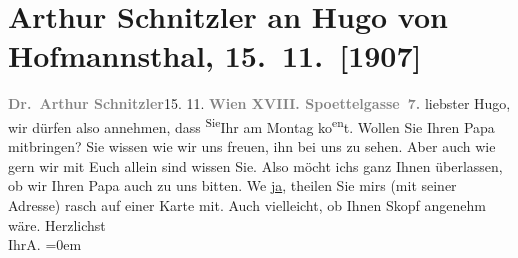 

         
         \renewcommand{\erwaehntePersonen}{Personen: Hugo von Hofmannsthal, Hugo August von Hofmannsthal, Gustav Schwarzkopf}
         \renewcommand{\erwaehnteOrte}{Orte: Edmund-Weiß-Gasse, Wien}
         \renewcommand{\erwaehnteWerke}{}
               \section[Arthur Schnitzler an Hugo von Hofmannsthal, 15. 11. {[}1907{]}]{ Arthur Schnitzler an Hugo von Hofmannsthal, 15. 11. {[}1907{]}}\nopagebreak{}\rehead{ }\begin{ledgroupsized}[t]{13cm}\normalsize\beginnumbering \toendnotes[C]{\smallbreak\pagebreak[2]} 
\toendnotes[C]{\smallbreak}\pstart
           {\pb}\textcolor{gray}{\textbf{Dr. Arthur Schnitzler}}\hfill 15.
                     11.\pend
           \pstart
           \textcolor{gray}{\textbf{Wien XVIII.
                        Spoettelgasse 7.}}\pend
           \pstart
           liebster Hugo, wir dürfen also annehmen, dass \substVorne{}\textsuperscript{Sie}\substDazwischen{}Ihr\substHinten{} am
                  Montag ko{\geminationm}\substVorne{}\textsuperscript{en}\substDazwischen{}t\substHinten{}. Wollen Sie Ihren Papa mitbringen? Sie wissen wie
               wir uns freuen, ihn bei uns zu sehen. Aber auch wie gern wir mit Euch allein sind
               wissen Sie. Also möcht ichs ganz Ihnen überlassen, ob wir {\pb}Ihren Papa auch zu uns
               bitten. We{\geminationn}{ }\uline{ja}, theilen Sie mirs (mit seiner Adresse) rasch auf einer
               Karte mit. Auch vielleicht, ob Ihnen Skopf
               angenehm wäre.\pend
           \pstart
           Herzlichst{\\[\baselineskip]}Ihr\spacefill\mbox{A.}\pend
           \leftskip=0em{}
         
         \endnumbering{}\end{ledgroupsized}  \newcommand{\dateiname}{L01731}\newcommand{\titel}{Arthur Schnitzler an Hugo von Hofmannsthal, 15. 11. [1907]}\newcommand{\editorInnen}{Martin Anton Müller und Gerd-Hermann Susen}
      